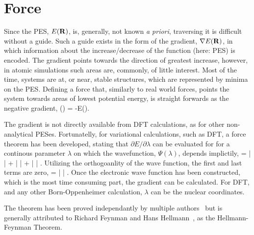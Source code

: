 \section{Force}
\label{sec:force}
Since the PES, $E({\mathrm{\mathbf{\bm{R}}}})$, is, generally, not known \textit{a priori}, traversing it is difficult without a guide.
Such a guide exists in the form of the gradient, $\nabla E({\mathrm{\mathbf{\bm{R}}}})$, in which information about the increase/decrease of the function (here: PES) is encoded.
The gradient points towards the direction of greatest increase, however, in atomic simulations such areas are, commonly, of little interest.
Most of the time, systems are at, or near, stable structures, which are represented by minima on the PES.
Defining a force that, similarly to real world forces, points the system towards areas of lowest potential energy, is straight forwards as the negative gradient,
\vF(\vR) = -\nabla E(\vR).
\eeq

The gradient is not directly available from DFT calculations, as for other non-analytical PESes.
Fortunatelly, for variational calculations, such as DFT, a force theorem has been developed, stating that $\partial E / \partial\lambda$ can be evaluated for for a continous parameter $\lambda$ on which the wavefunction, $\Psi(\lambda)$, depends implictily,
 = 
\bra \frac{\partial \Psi}{\partial \lambda} |  | \Psi \ket +
\bra \Psi |  | \Psi \ket +
\bra \Psi |  | \frac{\partial \Psi}{\partial \lambda} \ket.
\eeq
Utilizing the orthogoanlity of the wave function, the first and last terms are zero, 
 = \bra \Psi |  | \Psi \ket.
\eeq
Once the electronic wave function has been constructed, which is the most time consuming part, the gradient can be calculated.
For DFT, and any other Born-Oppenheimer calculation, $\lambda$ can be the nuclear coordinates.

The theorem has been proved independantly by multiple authors~\cite{forces-pauli-1933, forces-guttinger-1932} but is generally attributed to Richard Feynman\cite{forces-feynman-1939} and Hans Hellmann~\cite{forces-hellmann-1937}, as the Hellmann-Feynman Theorem.
